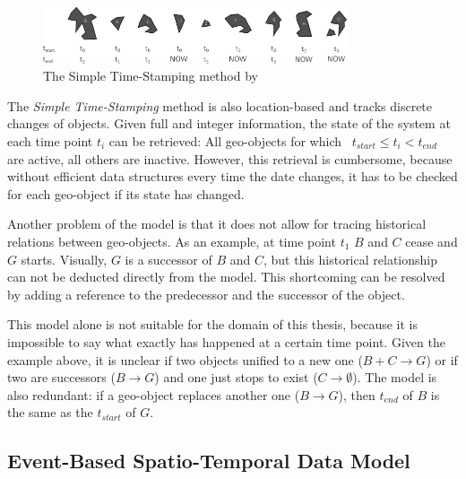 \begin{figure}[H]
  \vspace{1em}
  \centering
  \includegraphics[width=0.8\textwidth]{graphics/basics/stdm/simple_time_stamping}
  \caption{The Simple Time-Stamping method by \cite{hunter90timestamping}}
  \label{fig:simple_time_stamping}
\end{figure}

The \emph{Simple Time-Stamping} method is also location-based and tracks discrete changes of objects. Given full and integer information, the state of the system at each time point $t_i$ can be retrieved: All geo-objects for which ~$t_{start} \leq t_i < t_{end}$~ are active, all others are inactive. However, this retrieval is cumbersome, because without efficient data structures every time the date changes, it has to be checked for each geo-object if its state has changed.

Another problem of the model is that it does not allow for tracing historical relations between geo-objects. As an example, at time point $t_1$ $B$ and $C$ cease and $G$ starts. Visually, $G$ is a successor of $B$ and $C$, but this historical relationship can not be deducted directly from the model. This shortcoming can be resolved by adding a reference to the predecessor and the successor of the object.

This model alone is not suitable for the domain of this thesis, because it is impossible to say what exactly has happened at a certain time point. Given the example above, it is unclear if two objects unified to a new one ($B+C \to G$) or if two are successors ($B \to G$) and one just stops to exist ($C \to \emptyset$). The model is also redundant: if a geo-object replaces another one ($B \to G$), then $t_{end}$ of $B$ is the same as the $t_{start}$ of $G$.


\subsection{Event-Based Spatio-Temporal Data Model} %
\label{sub:event_based_spatio_temporal_data_model}

